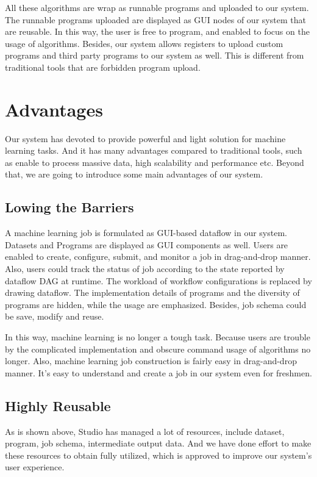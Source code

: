 \documentclass{sig-alternate-05-2015}
\begin{document}
All these algorithms are wrap as runnable programs and uploaded to our system. The runnable programs uploaded are displayed as GUI nodes of our system that are reusable. In this way, the user is free to program, and enabled to focus on the usage of algorithms. Besides, our system allows registers to upload custom programs and third party programs to our system as well. This is different from traditional tools that are forbidden program upload.

\section{Advantages}
Our system has devoted to provide powerful and light solution for machine learning tasks. And it has many advantages compared to traditional tools, such as enable to process massive data, high scalability and performance etc. Beyond that, we are going to introduce some main advantages of our system.
\subsection{Lowing the Barriers}
A machine learning job is formulated as GUI-based dataflow in our system. Datasets and Programs are displayed as GUI components as well. Users are enabled to create, configure, submit, and monitor a job in drag-and-drop manner. Also, users could track the status of job according to the state reported by dataflow DAG at runtime. The workload of workflow configurations is replaced by drawing dataflow. The implementation details of programs and the diversity of programs are hidden, while the usage are emphasized. Besides, job schema could be save, modify and reuse.

In this way, machine learning is no longer a tough task. Because users are trouble by the complicated implementation and obscure command usage of algorithms no longer. Also, machine learning job construction is fairly easy in drag-and-drop manner. It's easy to understand and create a job in our system even for freshmen.

\subsection{Highly Reusable}
As is shown above, Studio has managed a lot of resources, include dataset, program, job schema, intermediate output data. And we have done effort to make these resources to obtain fully utilized, which is approved to improve our system's user experience.
\end{document}
